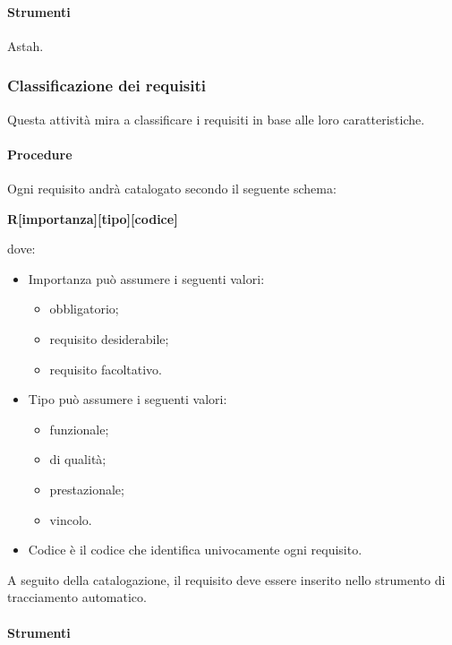 \paragraph{Strumenti}
Astah.



\subsubsection{Classificazione dei requisiti}
Questa attività mira a classificare i requisiti in base alle loro caratteristiche.

\paragraph{Procedure}
Ogni requisito andrà catalogato secondo il seguente schema:

\begin{center}
\textbf{R[importanza][tipo][codice]}
\end{center}
dove:
\begin{itemize}
\item Importanza può assumere i seguenti valori:
\begin{itemize}
\item {}  obbligatorio;
\item {} requisito desiderabile;
\item {} requisito facoltativo.
\end{itemize}
\item Tipo può assumere i seguenti valori:
\begin{itemize}
\item {} funzionale;
\item {} di qualità;
\item {} prestazionale;
\item {} vincolo.
\end{itemize}
\item Codice è il codice che identifica univocamente ogni requisito.
\end{itemize}

A seguito della catalogazione, il requisito deve essere inserito nello strumento di tracciamento automatico.


\paragraph{Strumenti}

